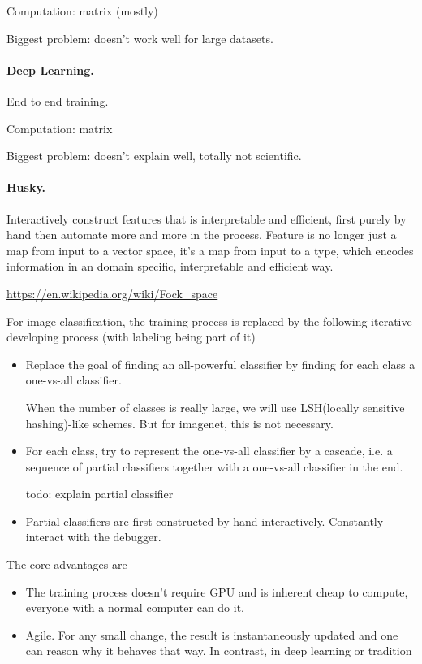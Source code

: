 \documentclass[11pt, oneside]{article}   	%
\theoremstyle{definition}
\begin{document}
Computation: matrix (mostly)

Biggest problem: doesn't work well for large datasets.


\paragraph{Deep Learning.}  End to end training.

Computation: matrix

Biggest problem: doesn't explain well, totally not scientific.

\paragraph{Husky.} Interactively construct features that is interpretable and efficient, first purely by hand then automate more and more in the process. Feature is no longer just a map from input to a vector space, it's a map from input to a type, which encodes information in an domain specific, interpretable and efficient way.

\url{https://en.wikipedia.org/wiki/Fock_space}

For image classification, the training process is replaced by the following iterative developing process (with labeling being part of it)

\begin{itemize}
	\item Replace the goal of finding an all-powerful classifier by finding for each class a one-vs-all classifier.

	\begin{rmk}
		When the number of classes is really large, we will use LSH(locally sensitive hashing)-like schemes. But for imagenet, this is not necessary.
	\end{rmk}
	\item For each class, try to represent the one-vs-all classifier by a cascade, i.e. a sequence  of partial classifiers together with a one-vs-all classifier in the end.

	todo: explain partial classifier
	\item Partial classifiers are first constructed by hand interactively. Constantly interact with the debugger.
\end{itemize}

The core advantages are
\begin{itemize}
	\item The training process doesn't require GPU and is inherent cheap to compute, everyone with a normal computer can do it.
	\item Agile. For any small change, the result is instantaneously updated and one can reason why it behaves that way. In contrast, in deep learning or tradition
\end{itemize}
\end{document}
